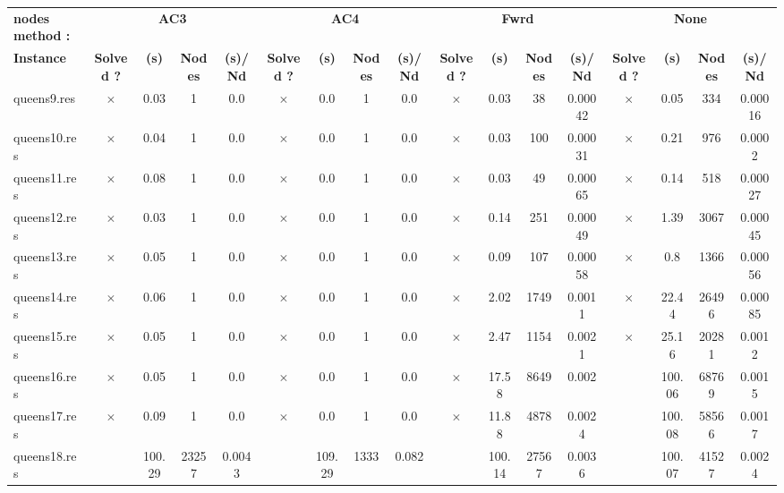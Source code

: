 \documentclass[main.tex]{subfiles}
\begin{document}
\newpage
\begin{landscape}
\begin{center}
\renewcommand{\arraystretch}{1.4} 
\begin{tabular}{|l|cccc|cccc|cccc|cccc|}
	\hline
\textbf{nodes method :} & \multicolumn{4}{c}{\textbf{AC3}} & \multicolumn{4}{c}{\textbf{AC4}} & \multicolumn{4}{c}{\textbf{Fwrd}} & \multicolumn{4}{c}{\textbf{None}}\\
\textbf{Instance}  & \textbf{Solved ?} & \textbf{(s)} & \textbf{Nodes} & \textbf{(s)/Nd} & \textbf{Solved ?} & \textbf{(s)} & \textbf{Nodes} & \textbf{(s)/Nd} & \textbf{Solved ?} & \textbf{(s)} & \textbf{Nodes} & \textbf{(s)/Nd} & \textbf{Solved ?} & \textbf{(s)} & \textbf{Nodes} & \textbf{(s)/Nd}\\\hline

queens9.res & $\times$ & 0.03 & 1 & 0.0
 & $\times$ & 0.0 & 1 & 0.0
 & $\times$ & 0.03 & 38 & 0.00042
 & $\times$ & 0.05 & 334 & 0.00016
\\
queens10.res & $\times$ & 0.04 & 1 & 0.0
 & $\times$ & 0.0 & 1 & 0.0
 & $\times$ & 0.03 & 100 & 0.00031
 & $\times$ & 0.21 & 976 & 0.0002
\\
queens11.res & $\times$ & 0.08 & 1 & 0.0
 & $\times$ & 0.0 & 1 & 0.0
 & $\times$ & 0.03 & 49 & 0.00065
 & $\times$ & 0.14 & 518 & 0.00027
\\
queens12.res & $\times$ & 0.03 & 1 & 0.0
 & $\times$ & 0.0 & 1 & 0.0
 & $\times$ & 0.14 & 251 & 0.00049
 & $\times$ & 1.39 & 3067 & 0.00045
\\
queens13.res & $\times$ & 0.05 & 1 & 0.0
 & $\times$ & 0.0 & 1 & 0.0
 & $\times$ & 0.09 & 107 & 0.00058
 & $\times$ & 0.8 & 1366 & 0.00056
\\
queens14.res & $\times$ & 0.06 & 1 & 0.0
 & $\times$ & 0.0 & 1 & 0.0
 & $\times$ & 2.02 & 1749 & 0.0011
 & $\times$ & 22.44 & 26496 & 0.00085
\\
queens15.res & $\times$ & 0.05 & 1 & 0.0
 & $\times$ & 0.0 & 1 & 0.0
 & $\times$ & 2.47 & 1154 & 0.0021
 & $\times$ & 25.16 & 20281 & 0.0012
\\
queens16.res & $\times$ & 0.05 & 1 & 0.0
 & $\times$ & 0.0 & 1 & 0.0
 & $\times$ & 17.58 & 8649 & 0.002
 &  & 100.06 & 68769 & 0.0015
\\
queens17.res & $\times$ & 0.09 & 1 & 0.0
 & $\times$ & 0.0 & 1 & 0.0
 & $\times$ & 11.88 & 4878 & 0.0024
 &  & 100.08 & 58566 & 0.0017
\\
queens18.res &  & 100.29 & 23257 & 0.0043
 &  & 109.29 & 1333 & 0.082
 &  & 100.14 & 27567 & 0.0036
 &  & 100.07 & 41527 & 0.0024

\end{tabular}
\end{center}
\end{landscape}
\end{document}
